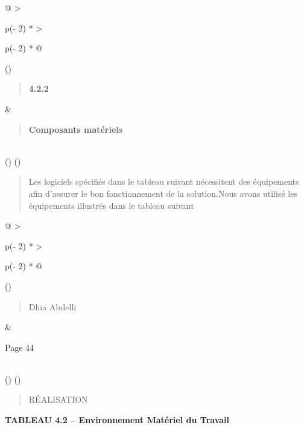 \documentclass[
]{article}
\begin{document}
\begin{longtable}[]{@{}
  >{\raggedright\arraybackslash}p{(\columnwidth - 2\tabcolsep) * }
  >{\raggedright\arraybackslash}p{(\columnwidth - 2\tabcolsep) * }@{}}
\toprule()
\begin{minipage}[b]{\linewidth}\raggedright
\begin{quote}
\textbf{4.2.2}
\end{quote}
\end{minipage} & \begin{minipage}[b]{\linewidth}\raggedright
\begin{quote}
\textbf{Composants matériels}
\end{quote}
\end{minipage} \\
\midrule()
\endhead
\bottomrule()
\end{longtable}

\begin{quote}
Les logiciels spécifiés dans le tableau suivant nécessitent des
équipements afin d'assurer le bon fonctionnement de la solution.Nous
avons utilisé les équipements illustrés dans le tableau suivant
\end{quote}

\begin{longtable}[]{@{}
  >{\raggedright\arraybackslash}p{(\columnwidth - 2\tabcolsep) * }
  >{\raggedright\arraybackslash}p{(\columnwidth - 2\tabcolsep) * }@{}}
\toprule()
\begin{minipage}[b]{\linewidth}\raggedright
\begin{quote}
Dhia Abdelli
\end{quote}
\end{minipage} & \begin{minipage}[b]{\linewidth}\raggedright
Page 44
\end{minipage} \\
\midrule()
\endhead
\bottomrule()
\end{longtable}

\begin{quote}
RÉALISATION
\end{quote}

\textbf{TABLEAU 4.2 -- Environnement Matériel du Travail}
\end{document}
